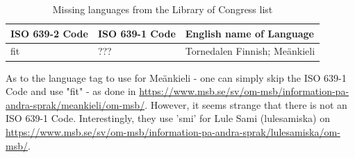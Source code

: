 \begin{table}[!ht]
    \caption{Missing languages from the Library of Congress list}
    \label{tab:languagesMissing}
    \begin{tabular}{L{3cm}|L{3cm}|L{6.5cm}}
      \textbf{ISO 639-2 Code} & \textbf{ISO 639-1 Code} & \textbf{English name of Language}\\
      \hline
fit & ??? & Tornedalen Finnish; \foreignlanguage{finnish}{Meänkieli}\\
\hline
   \end{tabular}
\end{table}
\FloatBarrier

As to the language tag to use for Meänkieli - one can simply skip the ISO 639-1 Code and use "fit" - as done in \url{https://www.msb.se/sv/om-msb/information-pa-andra-sprak/meankieli/om-msb/}.
However, it seems strange that there is not an ISO 639-1 Code. Interestingly, they use 'smi' for Lule Sami (\foreignlanguage{swedish}{lulesamiska}) on \url{https://www.msb.se/sv/om-msb/information-pa-andra-sprak/lulesamiska/om-msb/}.

